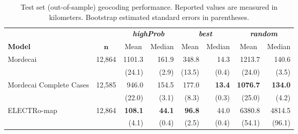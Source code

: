 \documentclass[11pt,a4paper]{article}
\begin{document}
\begin{table*}
    \centering
    \begin{tabular}{lrrrrrrr}
        \hline
        & & \multicolumn{2}{c}{\textbf{\emph{highProb}}} & \multicolumn{2}{c}{\textbf{\emph{best}}} & \multicolumn{2}{c}{\textbf{\emph{random}}} \\ \cline{3-4} \cline{5-6} \cline{7-8}
        \textbf{Model} & \multicolumn{1}{c}{$\textbf{n}$} & \multicolumn{1}{c}{Mean} & \multicolumn{1}{c}{Median} & \multicolumn{1}{c}{Mean} & \multicolumn{1}{c}{Median} & \multicolumn{1}{c}{Mean} & \multicolumn{1}{c}{Median} \\ \hline
        Mordecai & 12,864 & 1101.3 & 161.9 & 348.8 & 14.3 & 1213.7 & 140.6  \\
        & & (24.1) & (2.9) & (13.5) & (0.4) & (24.0) & (3.5) \\
        Mordecai Complete Cases & 12,585 & 946.0 & 154.5 & 177.0 & \textbf{13.4} & \textbf{1076.7} & \textbf{134.0}   \\
        & & (22.0) & (3.1) & (8.3) & (0.3) & (25.0) & (4.2) \\
        ELECTRo-map & 12,864 & \textbf{108.1} & \textbf{44.1} & \textbf{96.8} & 44.0 & 6380.8 & 4814.5  \\
        & & (4.1) & (0.4) & (2.5) & (0.4) & (54.1) & (96.1) \\
        \hline
    \end{tabular}\caption{Test set (out-of-sample) geocoding performance. Reported values are measured in kilometers. Bootstrap estimated standard errors in parentheses.}\label{tab:evaluation}
\end{table*}
\end{document}
